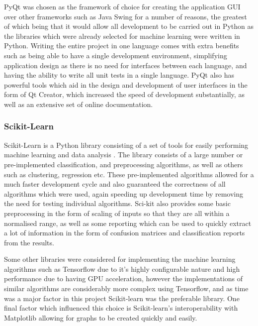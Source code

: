 \documentclass[12pt,a4paper]{article}
\begin{document}
PyQt was chosen as the framework of choice for creating the application GUI over other frameworks such as Java Swing for a number of reasons, the greatest of which being that it would allow all development to be carried out in Python as the libraries which were already selected for machine learning were written in Python. Writing the entire project in one language comes with extra benefits such as being able to have a single development environment, simplifying application design as there is no need for interfaces between each language, and having the ability to write all unit tests in a single language. PyQt also has powerful tools which aid in the design and development of user interfaces in the form of Qt Creator, which increased the speed of development substantially, as well as an extensive set of online documentation.

\subsubsection{Scikit-Learn}
Scikit-Learn is a Python library consisting of a set of tools for easily performing machine learning and data analysis \parencite{scikit}. The library consists of a large number or pre-implemented classification, and preprocessing algorithms, as well as others such as clustering, regression etc. These pre-implemented algorithms allowed for a much faster development cycle and also guaranteed the correctness of all algorithms which were used, again speeding up development time by removing the need for testing individual algorithms. Sci-kit also provides some basic preprocessing in the form of scaling of inputs so that they are all within a normalised range, as well as some reporting which can be used to quickly extract a lot of information in the form of confusion matrices and classification reports from the results.
	
	Some other libraries were considered for implementing the machine learning algorithms such as Tensorflow due to it's highly configurable nature and high performance due to having GPU acceleration, however the implementations of similar algorithms are considerably more complex using Tensorflow, and as time was a major factor in this project Scikit-learn was the preferable library. One final factor which influenced this choice is Scikit-learn's interoperability with Matplotlib allowing for graphs to be created quickly and easily.
\end{document}
